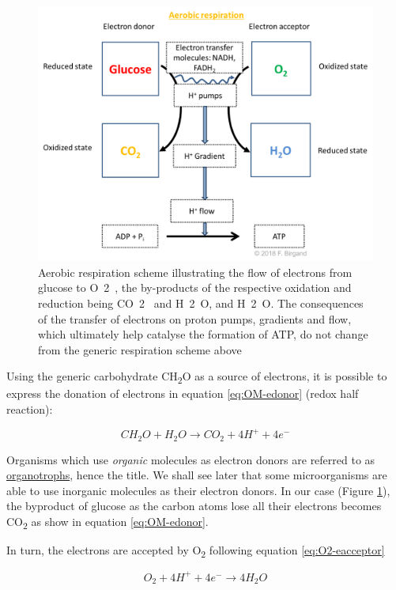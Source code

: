 \documentclass[]{book}
\theoremstyle{definition}
\theoremstyle{definition}
\theoremstyle{definition}
\theoremstyle{remark}
\begin{document}
\begin{figure}

{\centering \includegraphics[width=0.75\linewidth]{pictures/respiration-glucose-O2} 

}

\caption{Aerobic respiration scheme illustrating the flow of electrons from glucose to O~2~, the by-products of the respective oxidation and reduction being CO~2~ and H~2~O, and H~2~O. The consequences of the transfer of electrons on proton pumps, gradients and flow, which ultimately help catalyse the formation of ATP, do not change from the generic respiration scheme above}\label{fig:aerobic-resp-scheme-glucose}
\end{figure}

Using the generic carbohydrate CH\textsubscript{2}O as a source of
electrons, it is possible to express the donation of electrons in
equation \eqref{eq:OM-edonor} (redox half reaction):

\begin{equation}
CH_2O + H_2O \rightarrow CO_2 + 4 H^+ + 4 e^- 
\label{eq:OM-edonor}
\end{equation}

Organisms which use \emph{organic} molecules as electron donors are
referred to as \protect\hyperlink{trophic-names}{organotrophs}, hence
the title. We shall see later that some microorganisms are able to use
inorganic molecules as their electron donors. In our case (Figure
\ref{fig:aerobic-resp-scheme-glucose}), the byproduct of glucose as the
carbon atoms lose all their electrons becomes CO\textsubscript{2} as
show in equation \eqref{eq:OM-edonor}.

In turn, the electrons are accepted by O\textsubscript{2} following
equation \eqref{eq:O2-eacceptor}

\begin{equation}
O_2 + 4 H^+ + 4 e^- \rightarrow 4H_2O  
\label{eq:O2-eacceptor}
\end{equation}
\end{document}
